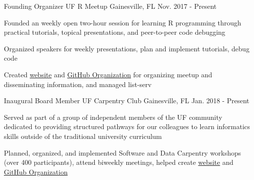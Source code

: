 

\begin{cventries}

  \cventry
    {Founding Organizer} %
    {UF R Meetup} %
    {Gainesville, FL} %
    {Nov. 2017 - Present} %
    {
      \begin{cvitems} %
        \item {Founded an weekly open two-hour session for learning R programming through practical tutorials, topical presentations, and peer-to-peer code debugging}
        \item {Organized speakers for weekly presentations, plan and implement tutorials, debug code}
        \item {Created \href{http://www.r-gators.com/}{website} and \href{https://github.com/ufrmeetup}{GitHub Organization} for organizing meetup and disseminating information, and managed list-serv}
      \end{cvitems}
    }



  \cventry
    {Inaugural Board Member} %
    {UF Carpentry Club} %
    {Gainesville, FL} %
    {Jan. 2018 - Present} %
    {
      \begin{cvitems} %
        \item {Served as part of a group of independent members of the UF community dedicated to providing structured pathways for our colleagues to learn informatics skills outside of the traditional university curriculum}
        \item {Planned, organized, and implemented Software and Data Carpentry workshops (over 400 participants), attend biweekly meetings, helped create \href{https://www.uf-carpentries.org/}{website} and \href{https://github.com/UF-Carpentry}{GitHub Organization}  }
      \end{cvitems}
    }


\end{cventries}
